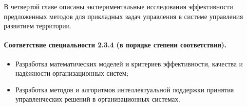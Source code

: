 В четвертой главе описаны экспериментальные исследования эффективности предложенных методов для прикладных задач управления в системе управления развитием территории.


\paragraph*{Соответствие специальности 2.3.4 (в порядке степени соответствия).}

\begin{itemize}
	\item[2.] Разработка математических моделей и критериев эффективности, качества и надёжности организационных систем;
	\item[9.] Разработка методов и алгоритмов интеллектуальной поддержки принятия управленческих решений в организационных системах.
\end{itemize}

